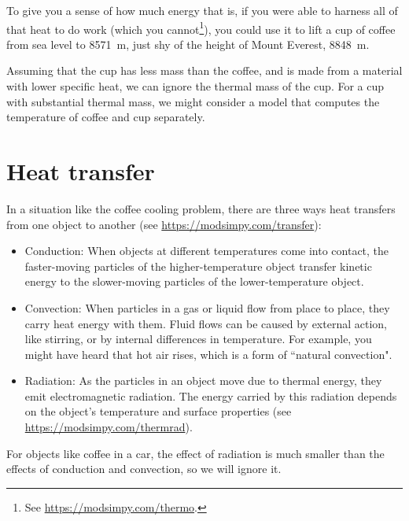 \documentclass[12pt]{book}
\theoremstyle{exercise}
\begin{document}
To give you a sense of how much energy that is, if you were able to harness all of that heat to do work (which you cannot\footnote{See \url{https://modsimpy.com/thermo}.}), you could use it to lift a cup of coffee from sea level to \SI{8571}{\meter}, just shy of the height of Mount Everest, \SI{8848}{\meter}.


Assuming that the cup has less mass than the coffee, and is made from a material with lower specific heat, we can ignore the thermal mass of the cup.
For a cup with substantial thermal mass, we might consider a model that computes the temperature of coffee and cup separately.


\section{Heat transfer}

In a situation like the coffee cooling problem, there are three ways heat transfers from one object to another (see \url{https://modsimpy.com/transfer}):


\begin{itemize}

\item Conduction: When objects at different temperatures come into contact, the faster-moving particles of the higher-temperature object transfer kinetic energy to the slower-moving particles of the lower-temperature object.

\item Convection: When particles in a gas or liquid flow from place to place, they carry heat energy with them.  Fluid flows can be caused by external action, like stirring, or by internal differences in temperature.  For example, you might have heard that hot air rises, which is a form of ``natural convection".


\item Radiation: As the particles in an object move due to thermal energy, they emit electromagnetic radiation.  The energy carried by this radiation depends on the object's temperature and surface properties (see \url{https://modsimpy.com/thermrad}).

\end{itemize}

For objects like coffee in a car, the effect of radiation is much smaller than 
the effects of conduction and convection, so we will ignore it.
\end{document}
